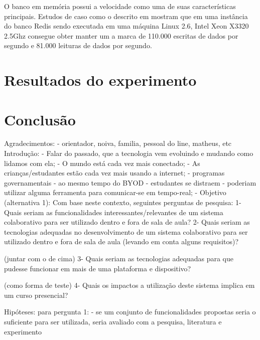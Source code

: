 O banco em memória possui a velocidade como uma de suas características principais. Estudos de caso como o descrito em \cite{redis_perf} mostram que em uma instância do banco Redis sendo executada em uma máquina Linux 2.6, Intel Xeon X3320 2.5Ghz consegue obter manter um a marca de 110.000 escritas de dados por segundo e 81.000 leituras de dados por segundo.



\chapter{Resultados do experimento}
\label{cap:resultados}


\chapter{Conclusão}
\label{cap:conclusao}





\iffalse
        Agradecimentos: 
            - orientador, noiva, familia, pessoal do line, matheus, etc
        Introdução:
            - Falar do passado, que a tecnologia vem evoluindo e mudando como lidamos com ela;
            - O mundo está cada vez mais conectado;
            - As crianças/estudantes estão cada vez mais usando a internet;
            - programas governamentais 
            - ao mesmo tempo do BYOD
                - estudantes se distraem
                - poderiam utilizar alguma ferramenta para comunicar-se em tempo-real;
            - Objetivo (alternativa 1):
                Com base neste contexto, seguintes perguntas de pesquisa:
                    1- Quais seriam as funcionalidades interessantes/relevantes de um sistema colaborativo para ser utilizado dentro e fora de sala de aula?
                    2- Quais seriam as tecnologias adequadas no desenvolvimento de um sistema colaborativo para ser utilizado dentro e fora de sala de aula (levando em conta alguns requisitos)?

                    (juntar com o de cima) 3- Quais seriam as tecnologias adequadas para que pudesse funcionar em mais de uma plataforma e dispositivo?

                    (como forma de teste) 4- Quais os impactos a utilização deste sistema implica em um curso presencial?

                    Hipóteses:
                    para pergunta 1:
                        - se um conjunto de funcionalidades propostas seria o suficiente para ser utilizada, seria avaliado com a pesquisa, literatura e experimento

